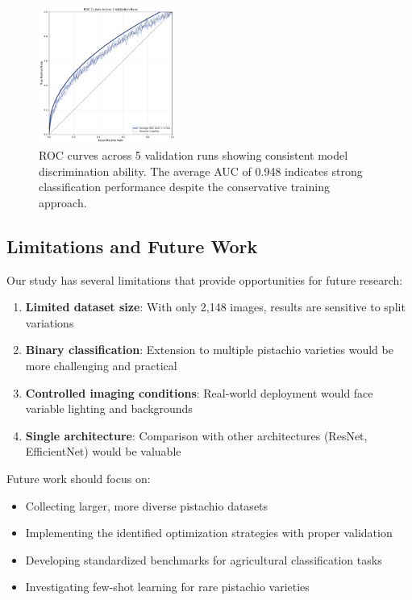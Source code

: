 \documentclass[conference]{IEEEtran}
\begin{document}
\begin{figure}[H]
\centering
\includegraphics[width=0.4\textwidth]{figures/roc_curves.pdf}
\caption{ROC curves across 5 validation runs showing consistent model discrimination ability. The average AUC of 0.948 indicates strong classification performance despite the conservative training approach.}
\label{fig:roc_curves}
\end{figure}

\subsection{Limitations and Future Work}

Our study has several limitations that provide opportunities for future research:

\begin{enumerate}
    \item \textbf{Limited dataset size}: With only 2,148 images, results are sensitive to split variations
    \item \textbf{Binary classification}: Extension to multiple pistachio varieties would be more challenging and practical
    \item \textbf{Controlled imaging conditions}: Real-world deployment would face variable lighting and backgrounds
    \item \textbf{Single architecture}: Comparison with other architectures (ResNet, EfficientNet) would be valuable
\end{enumerate}

Future work should focus on:
\begin{itemize}
    \item Collecting larger, more diverse pistachio datasets
    \item Implementing the identified optimization strategies with proper validation
    \item Developing standardized benchmarks for agricultural classification tasks
    \item Investigating few-shot learning for rare pistachio varieties
\end{itemize}
\end{document}
